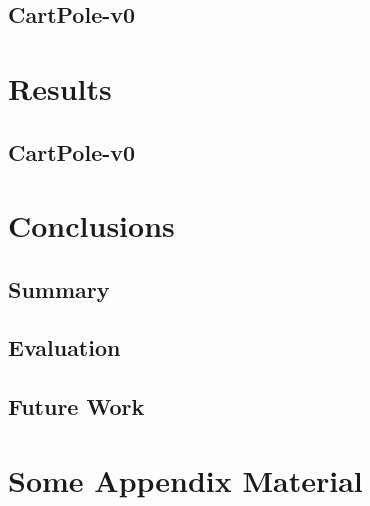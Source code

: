 \documentclass[11pt, a4paper, bibliography=totoc]{report}
\begin{document}
\section{CartPole-v0}

\chapter{Results}
\section{CartPole-v0}


\chapter{Conclusions}
\section{Summary}
\section{Evaluation}
\section{Future Work}





\appendix
\appendixpage
\noappendicestocpagenum
\addappheadtotoc
\chapter{Some Appendix Material}
\end{document}
